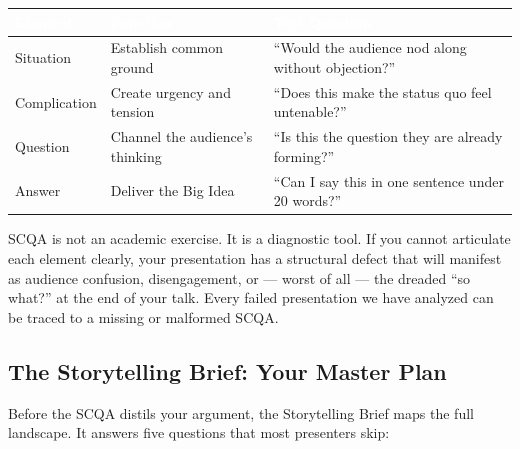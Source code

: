 \begin{center}
\begin{tabularx}{\textwidth}{>{\raggedright}p{2.5cm} >{\raggedright}p{4.5cm} >{\raggedright\arraybackslash}p{6.5cm}}
\toprule
\rowcolor{tableheader} \textcolor{white}{\textbf{Element}} & \textcolor{white}{\textbf{Function}} & \textcolor{white}{\textbf{Test Question}} \\
\midrule
Situation & Establish common ground & ``Would the audience nod along without objection?'' \\
\rowcolor{altrow}
Complication & Create urgency and tension & ``Does this make the status quo feel untenable?'' \\
Question & Channel the audience's thinking & ``Is this the question they are already forming?'' \\
\rowcolor{altrow}
Answer & Deliver the Big Idea & ``Can I say this in one sentence under 20 words?'' \\
\bottomrule
\end{tabularx}
\end{center}

\begin{insightbox}
SCQA is not an academic exercise. It is a diagnostic tool. If you cannot articulate each element clearly, your presentation has a structural defect that will manifest as audience confusion, disengagement, or --- worst of all --- the dreaded ``so what?'' at the end of your talk. Every failed presentation we have analyzed can be traced to a missing or malformed SCQA.
\end{insightbox}

\subsection{The Storytelling Brief: Your Master Plan}

Before the SCQA distils your argument, the Storytelling Brief maps the full landscape. It answers five questions that most presenters skip:

